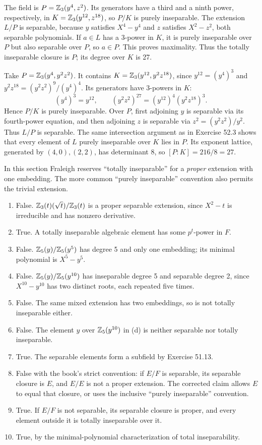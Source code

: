 The field is $P=\mathbb{Z}_3(y^4,z^2)$. Its generators have a third and a ninth power, respectively, in $K=\mathbb{Z}_3(y^{12},z^{18})$, so $P/K$ is purely inseparable. The extension $L/P$ is separable, because $y$ satisfies $X^4-y^4$ and $z$ satisfies $X^2-z^2$, both separable polynomials. If $a\in L$ has a $3$-power in $K$, it is purely inseparable over $P$ but also separable over $P$, so $a\in P$. This proves maximality. Thus the totally inseparable closure is $P$; its degree over $K$ is 27.

Take $P=\mathbb{Z}_3(y^4,y^2z^2)$. It contains $K=\mathbb{Z}_3(y^{12},y^2z^{18})$, since $y^{12}=(y^4)^3$ and $y^2z^{18}=(y^2z^2)^9/(y^4)^4$. Its generators have $3$-powers in $K$:
\[(y^4)^3=y^{12},\qquad(y^2z^2)^{27}=(y^{12})^4(y^2z^{18})^3.\]
Hence $P/K$ is purely inseparable. Over $P$, first adjoining $y$ is separable via its fourth-power equation, and then adjoining $z$ is separable via $z^2=(y^2z^2)/y^2$. Thus $L/P$ is separable. The same intersection argument as in Exercise 52.3 shows that every element of $L$ purely inseparable over $K$ lies in $P$. Its exponent lattice, generated by $(4,0),(2,2)$, has determinant 8, so $[P:K]=216/8=27$.

In this section Fraleigh reserves ``totally inseparable'' for a \emph{proper} extension with one embedding. The more common ``purely inseparable'' convention also permits the trivial extension.
\begin{enumerate}[label=(\alph*)]
\item False. $\mathbb{Z}_3(t)(\sqrt t)/\mathbb{Z}_3(t)$ is a proper separable extension, since $X^2-t$ is irreducible and has nonzero derivative.
\item True. A totally inseparable algebraic element has some $p^t$-power in $F$.
\item False. $\mathbb{Z}_5(y)/\mathbb{Z}_5(y^5)$ has degree 5 and only one embedding; its minimal polynomial is $X^5-y^5$.
\item False. $\mathbb{Z}_5(y)/\mathbb{Z}_5(y^{10})$ has inseparable degree 5 and separable degree 2, since $X^{10}-y^{10}$ has two distinct roots, each repeated five times.
\item False. The same mixed extension has two embeddings, so is not totally inseparable either.
\item False. The element $y$ over $\mathbb{Z}_5(y^{10})$ in (d) is neither separable nor totally inseparable.
\item True. The separable elements form a subfield by Exercise 51.13.
\item False with the book's strict convention: if $E/F$ is separable, its separable closure is $E$, and $E/E$ is not a proper extension. The corrected claim allows $E$ to equal that closure, or uses the inclusive ``purely inseparable'' convention.
\item True. If $E/F$ is not separable, its separable closure is proper, and every element outside it is totally inseparable over it.
\item True, by the minimal-polynomial characterization of total inseparability.
\end{enumerate}

